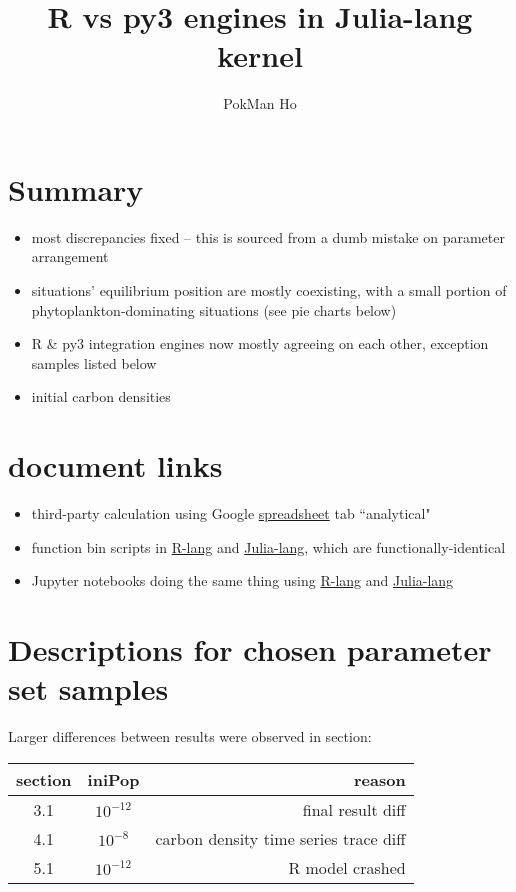\documentclass[a4paper,11pt]{article}
\title{R vs py3 engines in Julia-lang kernel}
\author{PokMan Ho}
\begin{document}
    \maketitle
    \section{Summary}
    \begin{itemize}
        \item most discrepancies fixed -- this is sourced from a dumb mistake on parameter arrangement
        \item situations' equilibrium position are mostly coexisting, with a small portion of phytoplankton-dominating situations (see pie charts below)
        \item R \& py3 integration engines now mostly agreeing on each other, exception samples listed below
        \item initial carbon densities 
    \end{itemize}
    
    \section{document links}
    \begin{itemize}
        \item third-party calculation using Google  \href{https://docs.google.com/spreadsheets/d/1k4eZ2qmefPx8dAj6BVPFUE00JBayk8zqMAfbH60slB8/edit#gid=939440998}{spreadsheet} tab ``analytical"
        \item function bin scripts in \href{https://github.com/ph-u/Project/blob/master/code/func.R}{R-lang} and \href{https://github.com/ph-u/Project/blob/master/code/func.jl}{Julia-lang}, which are functionally-identical
        \item Jupyter notebooks doing the same thing using \href{https://nbviewer.jupyter.org/github/ph-u/Project/blob/master/sandbox/cpb_0514_r.ipynb}{R-lang} and \href{https://nbviewer.jupyter.org/github/ph-u/Project/blob/master/sandbox/cpb_0514_jp.ipynb}{Julia-lang}
    \end{itemize}
    
    \section{Descriptions for chosen parameter set samples}
    Larger differences between results were observed in section:
    \begin{center}
        \begin{tabular}{cc|r}\hline
            section & iniPop & reason\\\hline
            3.1 & $10^{-12}$ & final result diff\\
            4.1 & $10^{-8}$ & carbon density time series trace diff\\
            5.1 & $10^{-12}$ & R model crashed\\\hline
        \end{tabular}
    \end{center}
    
\end{document}
